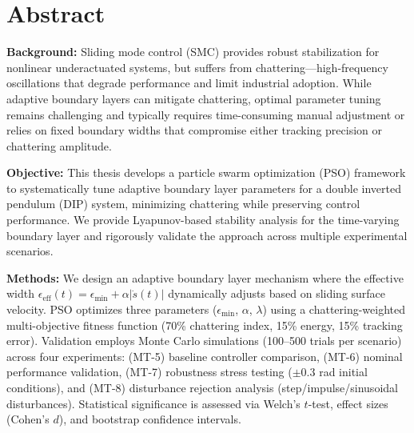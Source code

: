 
\chapter*{Abstract}

\noindent
\textbf{Background:}
Sliding mode control (SMC) provides robust stabilization for nonlinear underactuated systems, but suffers from chattering—high-frequency oscillations that degrade performance and limit industrial adoption. While adaptive boundary layers can mitigate chattering, optimal parameter tuning remains challenging and typically requires time-consuming manual adjustment or relies on fixed boundary widths that compromise either tracking precision or chattering amplitude.

\vspace{0.5cm}

\noindent
\textbf{Objective:}
This thesis develops a particle swarm optimization (PSO) framework to systematically tune adaptive boundary layer parameters for a double inverted pendulum (DIP) system, minimizing chattering while preserving control performance. We provide Lyapunov-based stability analysis for the time-varying boundary layer and rigorously validate the approach across multiple experimental scenarios.

\vspace{0.5cm}

\noindent
\textbf{Methods:}
We design an adaptive boundary layer mechanism where the effective width $\epsilon_{\text{eff}}(t) = \epsilon_{\min} + \alpha|\dot{s}(t)|$ dynamically adjusts based on sliding surface velocity. PSO optimizes three parameters ($\epsilon_{\min}$, $\alpha$, $\lambda$) using a chattering-weighted multi-objective fitness function (70\% chattering index, 15\% energy, 15\% tracking error). Validation employs Monte Carlo simulations (100--500 trials per scenario) across four experiments: (MT-5) baseline controller comparison, (MT-6) nominal performance validation, (MT-7) robustness stress testing ($\pm0.3$ rad initial conditions), and (MT-8) disturbance rejection analysis (step/impulse/sinusoidal disturbances). Statistical significance is assessed via Welch's $t$-test, effect sizes (Cohen's $d$), and bootstrap confidence intervals.

\vspace{0.5cm}

